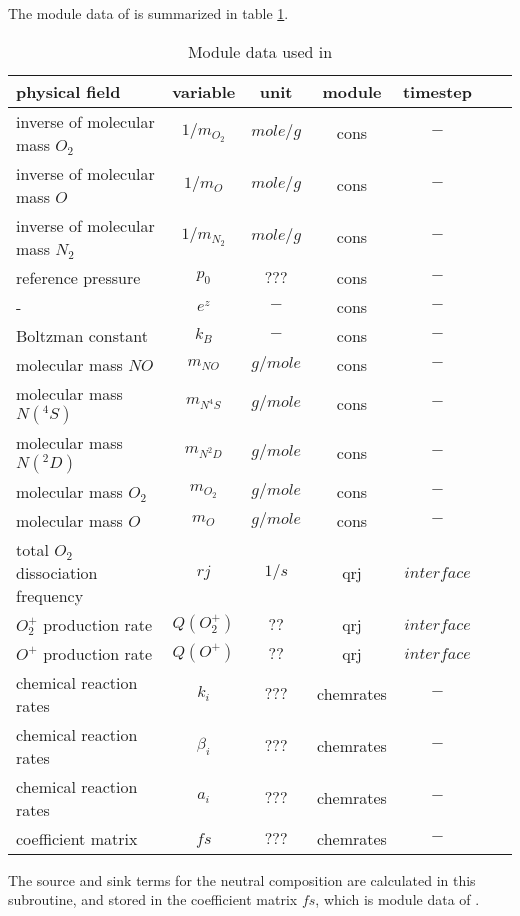 %
The module data of  is summarized in table
\ref{tab:module_comp_o2o}.
%
\begin{table}[tb]
\begin{tabular}{|p{3.5cm} ||c|c|c|c|c|c|} \hline
physical field               & variable        & unit&module&
timestep
\\ \hline \hline inverse of molecular mass $O_2$&
$1/m_{O_2}$ & $mole/g$ & cons & $-$ \\
inverse of molecular mass $O$& $1/m_{O}$ & $mole/g$ & cons & $-$ \\
inverse of molecular mass $N_2$& $1/m_{N_2}$ & $mole/g$ & cons & $-$ \\
reference pressure & $p_0$ & $???$ & cons & $-$ \\
- & $e^z$ & $-$ & cons & $-$ \\
Boltzman constant & $k_B$ & $-$ & cons & $-$ \\
 molecular mass $NO$& $m_{NO}$ & $g/mole$ & cons & $-$ \\
 molecular mass $N(^4S)$& $m_{N^4S}$ & $g/mole$ & cons & $-$ \\
 molecular mass $N(^2D)$& $m_{N^2D}$ & $g/mole$ & cons & $-$ \\
 molecular mass $O_2$& $m_{O_2}$ & $g/mole$ & cons & $-$ \\
 molecular mass $O$& $m_{O}$ & $g/mole$ & cons & $-$ \\
 total $O_2$ dissociation frequency& $rj$ & $1/s$ & qrj & $interface$ \\
 $O_2^+$ production rate& $Q(O_2^+)$ & $??$ & qrj & $interface$ \\
 $O^+$ production rate& $Q(O^+)$ & $??$ & qrj & $interface$ \\
 chemical reaction rates& $k_i$ & $???$ & chemrates & $-$ \\
 chemical reaction rates& $\beta_i$ & $???$ & chemrates & $-$ \\
 chemical reaction rates& $a_i$ & $???$ & chemrates & $-$ \\
 coefficient matrix & $fs$ & $???$ & chemrates & $-$
\\ \hline \hline
\end{tabular}
\caption{Module data used in }
\label{tab:module_comp_o2o}
\end{table}
%
The source and sink terms for the neutral composition are calculated
in this subroutine, and stored in the coefficient matrix $fs$, which
is module data of . \\

